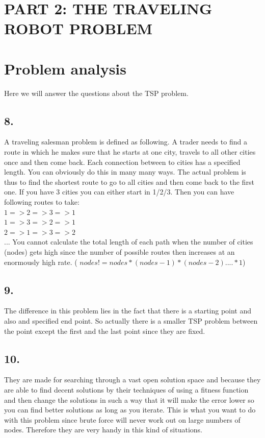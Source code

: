 \documentclass{scrartcl}
\begin{document}
\pagebreak
\section*{PART 2: THE TRAVELING ROBOT PROBLEM}
\section*{Problem analysis}
Here we will answer the questions about the TSP problem.

\subsection*{8.}
A traveling salesman problem is defined as following. A trader needs to find a route in which he makes sure that he starts at one city, travels to all other cities once and then come back. Each connection between to cities has a specified length. You can obviously do this in many many ways. The actual problem is thus to find the shortest route to go to all cities and then come back to the first one.
If you have 3 cities you can either start in 1/2/3. Then you can have following routes to take:\\
$1=>2=>3=>1$\\
$1=>3=>2=>1$\\
$2=>1=>3=>2$\\
...
You cannot calculate the total length of each path when the number of cities (nodes) gets high since the number of possible routes then increases at an enormously high rate. ( $nodes! = nodes*(nodes-1)*(nodes-2)....*1$)

\subsection*{9.}
The difference in this problem lies in the fact that there is a starting point and also and specified end point. So actually there is a smaller TSP problem between the point except the first and the last point since they are fixed.

\subsection*{10.}
They are made for searching through a vast open solution space and because they are able to find decent solutions by their techniques of using a fitness function and then change the solutions in such a way that it will make the error lower so you can find better solutions as long as you iterate. This is what you want to do with this problem since brute force will never work out on large numbers of nodes. Therefore they are very handy in this kind of situations.
\end{document}
